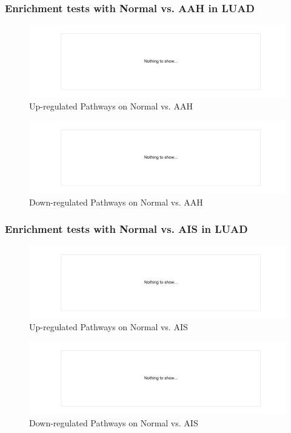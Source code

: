 \documentclass{beamer}
\begin{document}
    \begin{frame}
        \frametitle{Enrichment tests with Normal vs. AAH in LUAD}

        \begin{figure}
            \includegraphics[width=0.8 \linewidth]{figures/DEG/Enrichment/STAR.FPKM.ADC.Normal-AAH.Up.KEGG.pdf}
            \caption{Up-regulated Pathways on Normal vs. AAH}
        \end{figure}

        \begin{figure}
            \includegraphics[width=0.8 \linewidth]{figures/DEG/Enrichment/STAR.FPKM.ADC.Normal-AAH.Down.KEGG.pdf}
            \caption{Down-regulated Pathways on Normal vs. AAH}
        \end{figure}
    \end{frame}

    \begin{frame}
        \frametitle{Enrichment tests with Normal vs. AIS in LUAD}

        \begin{figure}
            \includegraphics[width=0.8 \linewidth]{figures/DEG/Enrichment/STAR.FPKM.ADC.Normal-AIS.Up.KEGG.pdf}
            \caption{Up-regulated Pathways on Normal vs. AIS}
        \end{figure}

        \begin{figure}
            \includegraphics[width=0.8 \linewidth]{figures/DEG/Enrichment/STAR.FPKM.ADC.Normal-AIS.Down.KEGG.pdf}
            \caption{Down-regulated Pathways on Normal vs. AIS}
        \end{figure}
    \end{frame}
\end{document}
